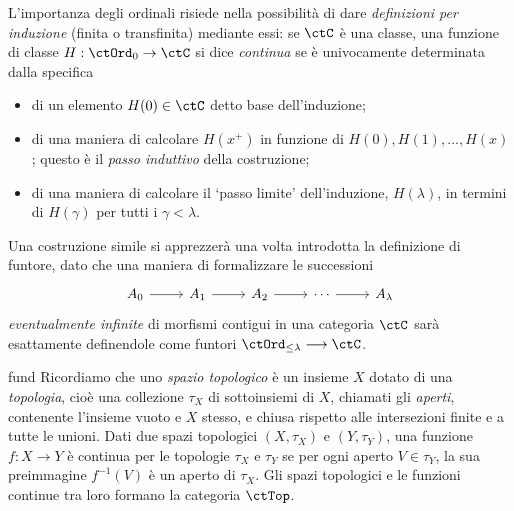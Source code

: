 \begin{remark}\label{es_catena_trans}
	L'importanza degli ordinali risiede nella possibilità di dare \emph{definizioni per induzione} (finita o transfinita) mediante essi: se \(\ctC\) è una classe, una funzione di classe \(H : \ctOrd_0\to\ctC\) si dice \emph{continua} se è univocamente determinata dalla specifica
	\begin{itemize}
		\item di un elemento \(H(0)\in\ctC\) detto base dell'induzione;
		\item di una maniera di calcolare \(H(x^+)\) in funzione di \(H(0), H(1),\dots,H(x)\); questo è il \emph{passo induttivo} della costruzione;
		\item di una maniera di calcolare il `passo limite' dell'induzione, \(H(\lambda)\), in termini di \(H(\gamma)\) per tutti i \(\gamma < \lambda\).
	\end{itemize}
	Una costruzione simile si apprezzerà una volta introdotta la definizione di funtore, dato che una maniera di formalizzare le successioni
	\[\begin{tikzcd}
			A_0 \ar[r] & A_1 \ar[r] & A_2 \ar[r] & \cdots \ar[r] & A_\lambda
		\end{tikzcd}\]
	\emph{eventualmente infinite} di morfismi contigui in una categoria \(\ctC\) sarà esattamente definendole come funtori \(\ctOrd_{\le\lambda}\funto \ctC\).
\end{remark}
\begin{hExample}{fund}\label{ex_cat_top}
	Ricordiamo che uno \emph{spazio topologico} è un insieme \(X\) dotato di una \emph{topologia}, cioè una collezione \(\tau_X\) di sottoinsiemi di \(X\), chiamati gli \emph{aperti}, contenente l'insieme vuoto e \(X\) stesso, e chiusa rispetto alle intersezioni finite e a tutte le unioni.
	Dati due spazi topologici \((X,\tau_X)\) e \((Y,\tau_Y)\), una funzione \(f:X\to Y\) è continua per le topologie \(\tau_X\) e \(\tau_Y\) se per ogni aperto \(V\in\tau_Y\), la sua preimmagine \(f^{-1}(V)\) è un aperto di \(\tau_X\).
	Gli spazi topologici e le funzioni continue tra loro formano la categoria \(\ctTop\).
\end{hExample}
